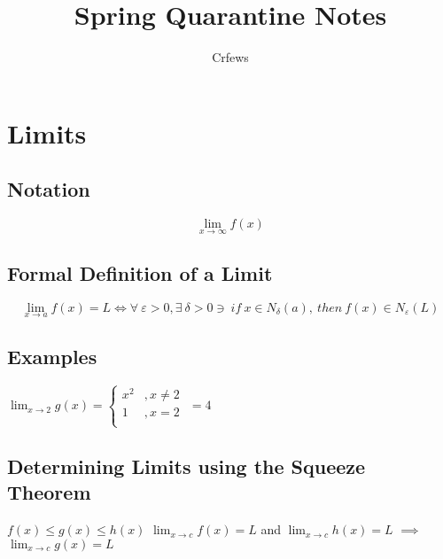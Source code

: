 \documentclass[12pt]{article}
\title{Spring Quarantine Notes}
\author{Crfews}
\begin{document}
    \maketitle
    \section{Limits}
    \subsection{Notation}
        $$\lim_{x\to\infty} f(x)$$
    \subsection{Formal Definition of a Limit}
        $$\lim_{x\to a} f(x) = L \iff \forall \ \varepsilon > 0, \exists \  \delta > 0  \ni\  if \  x \in N_{\delta}(a),\  then\  f(x)\in N_{\varepsilon}(L)$$
    \subsection{Examples}
        \(  \lim_{x\to 2} g(x) =
        \begin{cases}
                x^{2} &, x\neq 2\\
                1 &, x = 2\\
            \end{cases}
        \) $ = 4$
    \subsection{Determining Limits using the Squeeze Theorem}
        $f(x) \leq g(x) \leq h(x)$\newline
        $\lim_{x\to c} f(x) = L$ and $\lim_{x\to c} h(x) = L$ $\implies$ $\lim_{x\to c} g(x) = L$
    
\end{document}
